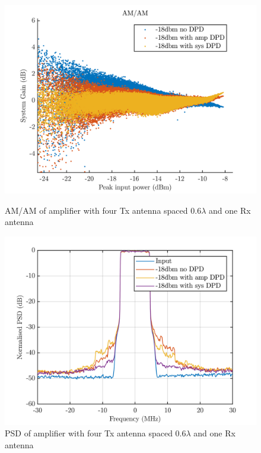 \begin{figure}[H]
  \centering
  \begin{minipage}[b]{0.5\textwidth}
	\includegraphics[scale = 0.5]{figures/measurement/cree/four/amam_four_ant_0p6.png}
	\caption{AM/AM of amplifier with four Tx antenna spaced $0.6\lambda$ and one Rx antenna}
    \label{fig:cree_amam_four_ant5}
  \end{minipage}
  \hfill
  \begin{minipage}[b]{0.4\textwidth}
\includegraphics[scale = 0.5]{figures/measurement/cree/four/psd_four_ant_0p1.png}
\caption{PSD of amplifier with four Tx antenna spaced $0.6\lambda$ and one Rx antenna}
    \label{fig:cree_psd_four_ant5}
  \end{minipage}
\end{figure}





